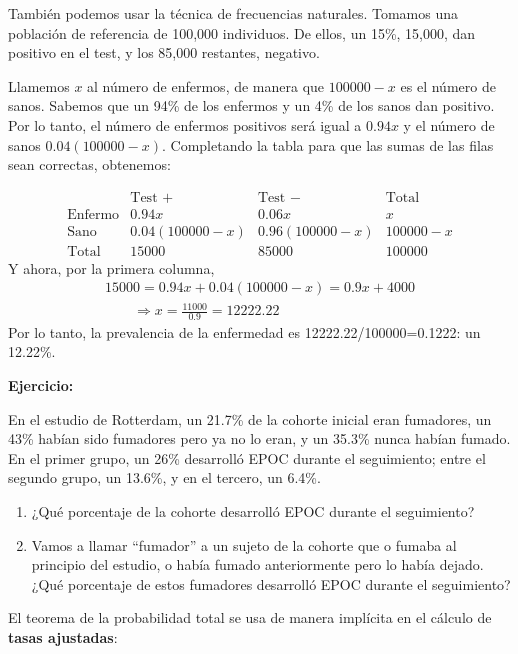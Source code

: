 \documentclass[
  spanish,
  letterpaper,
  DIV=11,
  numbers=noendperiod]{scrreprt}
\begin{document}
\begin{tcolorbox}
También podemos usar la técnica de frecuencias naturales. Tomamos una
población de referencia de 100,000 individuos. De ellos, un 15\%,
15,000, dan positivo en el test, y los 85,000 restantes, negativo.

Llamemos \(x\) al número de enfermos, de manera que \(100000-x\) es el
número de sanos. Sabemos que un 94\% de los enfermos y un 4\% de los
sanos dan positivo. Por lo tanto, el número de enfermos positivos será
igual a \(0.94x\) y el número de sanos \(0.04(100000-x)\). Completando
la tabla para que las sumas de las filas sean correctas, obtenemos:

\[
\begin{array}{l|c|c|c}
& \text{Test }+ & \text{Test }- & \text{Total}\\
\hline
\text{Enfermo} & 0.94x  & 0.06x  & x \\ \hline
\text{Sano} & 0.04(100000-x) &  0.96(100000-x) & 100000-x \\\hline
\text{Total} & 15000 &  85000 &   100000
\end{array}
\] Y ahora, por la primera columna, \[
\begin{array}{l}
15000=0.94x+0.04(100000-x)=0.9x+4000\\
\qquad\displaystyle \Longrightarrow x=\frac{11000}{0.9}=12222.22
\end{array}
\] Por lo tanto, la prevalencia de la enfermedad es
12222.22/100000=0.1222: un 12.22\%.

\textbf{Ejercicio:}

En el estudio de Rotterdam, un 21.7\% de la cohorte inicial eran
fumadores, un 43\% habían sido fumadores pero ya no lo eran, y un 35.3\%
nunca habían fumado. En el primer grupo, un 26\% desarrolló EPOC durante
el seguimiento; entre el segundo grupo, un 13.6\%, y en el tercero, un
6.4\%.

\begin{enumerate}
\def\labelenumi{\arabic{enumi}.}
\item
  ¿Qué porcentaje de la cohorte desarrolló EPOC durante el seguimiento?
\item
  Vamos a llamar ``fumador'' a un sujeto de la cohorte que o fumaba al
  principio del estudio, o había fumado anteriormente pero lo había
  dejado. ¿Qué porcentaje de estos fumadores desarrolló EPOC durante el
  seguimiento?
\end{enumerate}

El teorema de la probabilidad total se usa de manera implícita en el
cálculo de \textbf{tasas ajustadas}:


\end{tcolorbox}
\end{document}
